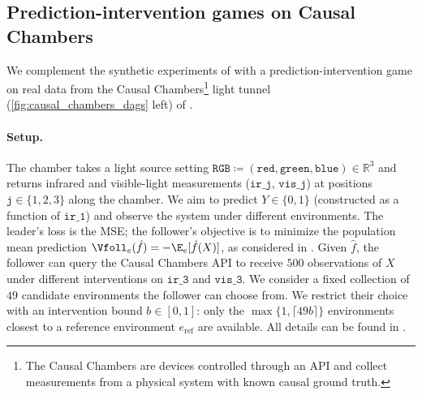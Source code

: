 \subsection{Prediction-intervention games on Causal Chambers} \label{sec:new_chamber_experiments}
We complement the synthetic experiments of  with a prediction-intervention game on real data from the Causal Chambers\footnote{The Causal Chambers are devices controlled through an API and collect measurements from a physical system with known causal ground truth.} light tunnel (\cref{fig:causal_chambers_dags} left) of \citet{gamellaCausalChambersRealworld2025}.


\paragraph{Setup.} 
The chamber takes a light source setting $\mathtt{RGB} \coloneq (\mathtt{red}, \mathtt{green}, \mathtt{blue}) \in \mathbb{R}^3$ and returns infrared and visible-light measurements ($\mathtt{ir\_j}$, $\mathtt{vis\_j}$) at positions $\mathtt{j} \in \{1,2,3\}$ along the chamber.
We aim to predict $Y \in \{0,1\}$ (constructed %
as a function of $\mathtt{ir\_1}$) 
and observe the system under different environments. 
The leader's loss is the MSE; the follower's objective is to minimize the population mean prediction $\Vfoll_e(\hat{f}) = -\E_e[\hat{f}(X)]$, as considered in .
Given $\hat{f}$, the follower can query the Causal Chambers API to receive $500$ observations of $X$ under different interventions on $\mathtt{ir\_3}$ and $\mathtt{vis\_3}$. We consider a fixed collection of $49$ candidate environments the follower can choose from. We restrict their choice with an intervention bound $b \in [0, 1]$: only the $\max\{1,\lceil 49b \rceil \}$
environments closest to a reference environment $e_\mathrm{ref}$ are available.
All details can be found in .


